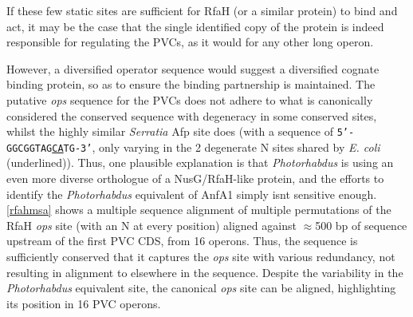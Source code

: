 If these few static sites are sufficient for RfaH (or a similar protein) to bind and act, it may be the case that the single identified copy of the protein is indeed responsible for regulating the PVCs, as it would for any other long operon.

However, a diversified operator sequence would suggest a diversified cognate binding protein, so as to ensure the binding partnership is maintained. The putative \emph{ops} sequence for the PVCs does not adhere to what is canonically considered the conserved sequence with degeneracy in some conserved sites, whilst the highly similar \emph{Serratia} Afp site does (with a sequence of \texttt{5'-GGCGGTAG\underline{CA}TG-3'}, only varying in the 2 degenerate N sites shared by \emph{E. coli} (underlined)). Thus, one plausible explanation is that \emph{Photorhabdus} is using an even more diverse orthologue of a NusG/RfaH-like protein, and the efforts to identify the \emph{Photorhabdus} equivalent of AnfA1 simply isnt sensitive enough. 
\vref{rfahmsa} shows a multiple sequence alignment of multiple permutations of the RfaH \emph{ops} site (with an N at every position) aligned against $\approx$500 bp of sequence upstream of the first PVC CDS, from 16 operons. Thus, the sequence is sufficiently conserved that it captures the \emph{ops} site with various redundancy, not resulting in alignment to elsewhere in the sequence. Despite the variability in the \emph{Photorhabdus} equivalent site, the canonical \emph{ops} site can be aligned, highlighting its position in 16 PVC operons.

